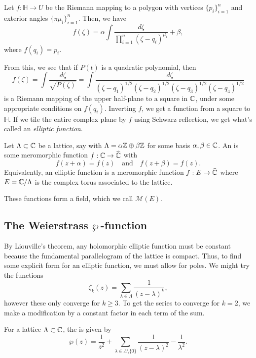 \documentclass{lkx_paper}
\begin{document}
\begin{theorem}
	Let $f : \mathbb{H} \to U$ be the Riemann mapping to a polygon with vertices $\{p_i\}_{i=1}^n$ and exterior angles $\{\pi \mu_i\}_{i=1}^n$. Then, we have
	\[
		f(\zeta) = \alpha\int \frac{d\zeta}{\prod_{i=1}^n (\zeta-q_i)^{\mu_i}}+\beta,
	\]
	where $f(q_i)=p_i$.
\end{theorem}

From this, we see that if $P(t)$ is a quadratic polynomial, then
\[
	f(\zeta) = \int \frac{d\zeta}{\sqrt{P(\zeta)}}
	=\int \frac{d\zeta}{(\zeta-q_1)^{1/2}(\zeta-q_2)^{1/2}(\zeta-q_3)^{1/2}(\zeta-q_4)^{1/2}}
\]
is a Riemann mapping of the upper half-plane to a square in $\mathbb{C}$, under some appropriate conditions on $f(q_i)$. Inverting $f$, we get a function from a square to $\mathbb{H}$. If we tile the entire complex plane by $f$ using Schwarz reflection, we get what's called an \emph{elliptic function}.

\begin{definition}
	Let $\Lambda\subset \mathbb{C}$ be a lattice, say with $\Lambda = \alpha\mathbb{Z}\oplus \beta\mathbb{Z}$ for some basis $\alpha,\beta\in \mathbb{C}$. An  is some meromorphic function $f : \mathbb{C} \to \widehat{\mathbb{C}}$ with
	\[
		f(z + \alpha)=f(z)\quad\textrm{and}\quad f(z+\beta)=f(z).
	\]
	Equivalently, an elliptic function is a meromorphic function $f : E \to \widehat{\mathbb{C}}$ where $E=\mathbb{C}/\Lambda$ is the complex torus associated to the lattice.
\end{definition}

These functions form a field, which we call $\mathcal{M}(E)$.

\subsection{The Weierstrass \texorpdfstring{$\wp\,$}{p}-function}

By Liouville's theorem, any holomorphic elliptic function must be constant because the fundamental parallelogram of the lattice is compact. Thus, to find some explicit form for an elliptic function, we must allow for poles. We might try the functions
\[
	\zeta_k(z) = \sum_{\lambda\in \Lambda}\frac{1}{(z-\lambda)^k},
\]
however these only converge for $k\geq 3$. To get the series to converge for $k=2$, we make a modification by a constant factor in each term of the sum.

\begin{definition}
	For a lattice $\Lambda\subset \mathbb{C}$, the  is given by
	\[
		\wp(z) = \frac{1}{z^2} + \sum_{\lambda\in \Lambda\setminus\{0\}} \frac{1}{(z-\lambda)^2} - \frac{1}{\lambda^2}.
	\]
\end{definition}
\end{document}
